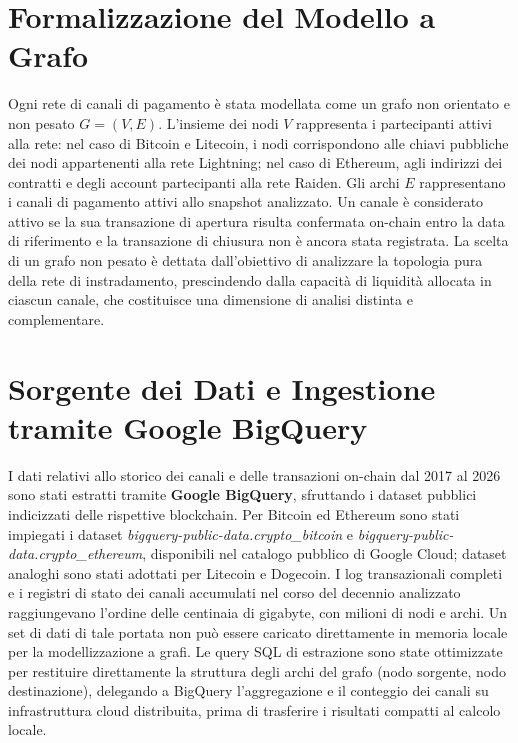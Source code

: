 \documentclass[12pt,a4paper,oneside]{book}
\begin{document}
\section{Formalizzazione del Modello a Grafo}
Ogni rete di canali di pagamento è stata modellata come un grafo non orientato e non pesato $G = (V, E)$. L'insieme dei nodi $V$ rappresenta i partecipanti attivi alla rete: nel caso di Bitcoin e Litecoin, i nodi corrispondono alle chiavi pubbliche dei nodi appartenenti alla rete Lightning; nel caso di Ethereum, agli indirizzi dei contratti e degli account partecipanti alla rete Raiden. Gli archi $E$ rappresentano i canali di pagamento attivi allo snapshot analizzato. Un canale è considerato attivo se la sua transazione di apertura risulta confermata on-chain entro la data di riferimento e la transazione di chiusura non è ancora stata registrata. La scelta di un grafo non pesato è dettata dall'obiettivo di analizzare la topologia pura della rete di instradamento, prescindendo dalla capacità di liquidità allocata in ciascun canale, che costituisce una dimensione di analisi distinta e complementare.

\section{Sorgente dei Dati e Ingestione tramite Google BigQuery}
\label{sec:sorgente-dati}
I dati relativi allo storico dei canali e delle transazioni on-chain dal 2017 al 2026 sono stati estratti tramite \textbf{Google BigQuery}, sfruttando i dataset pubblici indicizzati delle rispettive blockchain. Per Bitcoin ed Ethereum sono stati impiegati i dataset \textit{bigquery-public-data.crypto\_bitcoin} e \textit{bigquery-public-data.crypto\_ethereum}, disponibili nel catalogo pubblico di Google Cloud; dataset analoghi sono stati adottati per Litecoin e Dogecoin. I log transazionali completi e i registri di stato dei canali accumulati nel corso del decennio analizzato raggiungevano l'ordine delle centinaia di gigabyte, con milioni di nodi e archi. Un set di dati di tale portata non può essere caricato direttamente in memoria locale per la modellizzazione a grafi. Le query SQL di estrazione sono state ottimizzate per restituire direttamente la struttura degli archi del grafo (nodo sorgente, nodo destinazione), delegando a BigQuery l'aggregazione e il conteggio dei canali su infrastruttura cloud distribuita, prima di trasferire i risultati compatti al calcolo locale.
\end{document}
